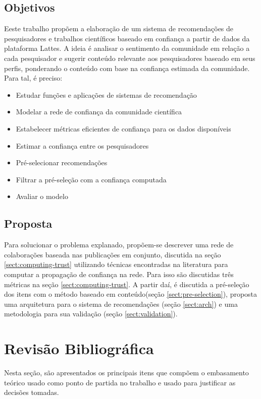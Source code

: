 \documentclass[12pt]{article}
\begin{document}
\subsection{Objetivos}

Eeste trabalho propõem a elaboração de um sistema de recomendações de pesquisadores e trabalhos científicos baseado 
em confiança a partir de dados da plataforma Lattes. A ideia é analisar o sentimento da comunidade em relação a cada
pesquisador e sugerir conteúdo relevante aos pesquisadores baseado em seus perfis, ponderando o conteúdo com base na 
confiança estimada da comunidade. Para tal, é preciso:

\begin{itemize}
  \item Estudar funções e aplicações de sistemas de recomendação
  \item Modelar a rede de confiança da comunidade científica
  \item Estabelecer métricas eficientes de confiança para os dados disponíveis
  \item Estimar a confiança entre os pesquisadores 
  \item Pré-selecionar recomendações
  \item Filtrar a pré-seleção com a confiança computada
  \item Avaliar o modelo
\end{itemize}

\subsection{Proposta}

Para solucionar o problema explanado, propõem-se descrever uma rede de colaborações baseada nas publicações em conjunto, 
discutida na seção \ref{sect:computing-trust} utilizando técnicas encontradas na literatura para computar a propagação de 
confiança na rede. Para isso são discutidas três métricas na seção \ref{sect:computing-trust}. A partir daí, é discutida a 
pré-seleção dos itens com o método baseado em conteúdo(seção \ref{sect:pre-selection}), proposta uma arquitetura para o sistema 
de recomendações (seção \ref{sect:arch}) e uma metodologia para sua validação (seção \ref{sect:validation}).

\section{Revisão Bibliográfica}

Nesta seção, são apresentados os principais itens que compõem o embasamento teórico usado como ponto de 
partida no trabalho e usado para justificar as decisões tomadas.
\end{document}
